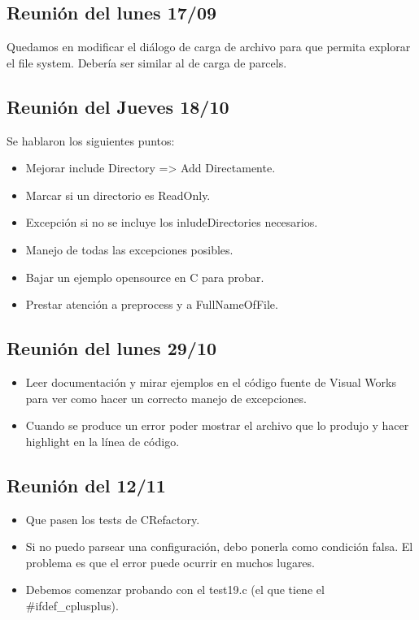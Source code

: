 \documentclass[a4paper,oneside,10pt]{article}
\begin{document}
\subsection{Reunión del lunes 17/09}
Quedamos en modificar el diálogo de carga de archivo para que permita explorar el file system. Debería ser similar al de carga de parcels.

\subsection{Reunión del Jueves 18/10}
Se hablaron los siguientes puntos:
\begin{itemize}
 \item Mejorar include Directory => Add Directamente.
 \item Marcar si un directorio es ReadOnly.
 \item Excepción si no se incluye los inludeDirectories necesarios. 
 \item Manejo de todas las excepciones posibles.
 \item Bajar un ejemplo opensource en C para probar.
 \item Prestar atención a preprocess y a FullNameOfFile.
\end{itemize}

\subsection{Reunión del lunes 29/10}
\begin{itemize}
 \item Leer documentación y mirar ejemplos en el código fuente de Visual Works para ver como hacer un correcto manejo de excepciones.
 \item Cuando se produce un error poder mostrar el archivo que lo produjo y hacer highlight en la línea de código.
\end{itemize}

\subsection{Reunión del 12/11}
\begin{itemize}
\item Que pasen los tests de CRefactory.
\item Si no puedo parsear una configuración, debo ponerla como condición falsa.  El problema es que el error puede ocurrir en muchos lugares.\item Debemos comenzar probando con el test19.c (el que tiene el \#ifdef\_cplusplus).
\end{itemize}
\end{document}
